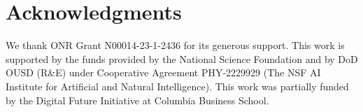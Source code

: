 \documentclass[11pt]{article}
\begin{document}






\newpage

\section*{Acknowledgments}\label{sec:acknowledgments}

We thank ONR Grant N00014-23-1-2436 for its generous support.  This work is supported by the funds provided by the National Science Foundation and by DoD OUSD (R\&E) under Cooperative Agreement PHY-2229929 (The NSF AI Institute for Artificial and Natural Intelligence). This work was partially funded by the Digital Future Initiative at Columbia Business School.





\newpage
\begin{appendix}

\end{appendix}
\end{document}
